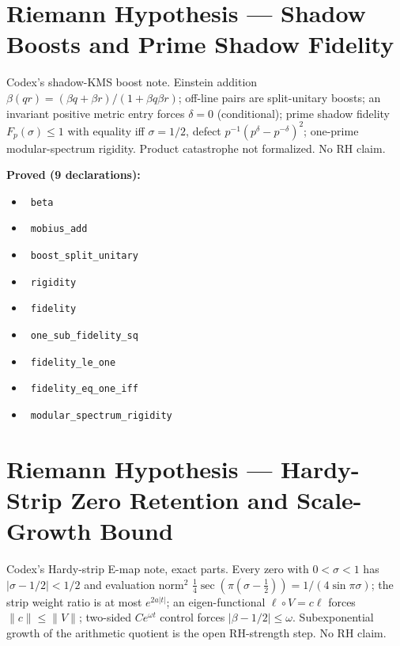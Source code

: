 \documentclass{report}
\theoremstyle{definition}
\begin{document}
\section{Riemann Hypothesis --- Shadow Boosts and Prime Shadow Fidelity}
Codex's shadow-KMS boost note. Einstein addition $\beta(qr)=(\beta q+\beta r)/(1+\beta q\beta r)$; off-line pairs are split-unitary boosts; an invariant positive metric entry forces $\delta=0$ (conditional); prime shadow fidelity $F_p(\sigma)\le1$ with equality iff $\sigma=1/2$, defect $p^{-1}(p^\delta-p^{-\delta})^2$; one-prime modular-spectrum rigidity. Product catastrophe not formalized. No RH claim.

\noindent\textbf{Proved (9 declarations):}
\begin{itemize}
  \item {}\leanok\ \texttt{beta}
  \item {}\leanok\ \texttt{mobius\_add}
  \item {}\leanok\ \texttt{boost\_split\_unitary}
  \item {}\leanok\ \texttt{rigidity}
  \item {}\leanok\ \texttt{fidelity}
  \item {}\leanok\ \texttt{one\_sub\_fidelity\_sq}
  \item {}\leanok\ \texttt{fidelity\_le\_one}
  \item {}\leanok\ \texttt{fidelity\_eq\_one\_iff}
  \item {}\leanok\ \texttt{modular\_spectrum\_rigidity}
\end{itemize}

\section{Riemann Hypothesis --- Hardy-Strip Zero Retention and Scale-Growth Bound}
Codex's Hardy-strip E-map note, exact parts. Every zero with $0<\sigma<1$ has $|\sigma-1/2|<1/2$ and evaluation norm$^2$ $\tfrac14\sec(\pi(\sigma-\tfrac12))=1/(4\sin\pi\sigma)$; the strip weight ratio is at most $e^{2a|t|}$; an eigen-functional $\ell\circ V=c\ell$ forces $\|c\|\le\|V\|$; two-sided $Ce^{\omega t}$ control forces $|\beta-1/2|\le\omega$. Subexponential growth of the arithmetic quotient is the open RH-strength step. No RH claim.
\end{document}

